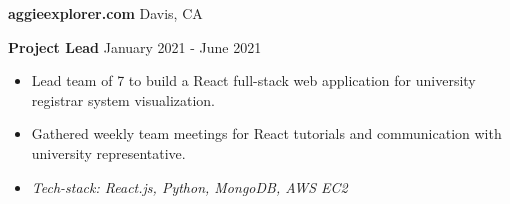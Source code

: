 \documentclass[11pt]{article}
\begin{document}
\vspace{8pt}

\textbf{aggieexplorer.com} \hfill Davis, CA

\textbf{Project Lead} \hfill January 2021 - June 2021
\begin{itemize}[noitemsep, topsep=0pt, partopsep=0pt, parsep=0pt]
    \item Lead team of 7 to build a React full-stack web application for university registrar system visualization.
    \item Gathered weekly team meetings for React tutorials and communication with university representative.
    \item \textit{Tech-stack: React.js, Python, MongoDB, AWS EC2}
\end{itemize}
\end{document}

